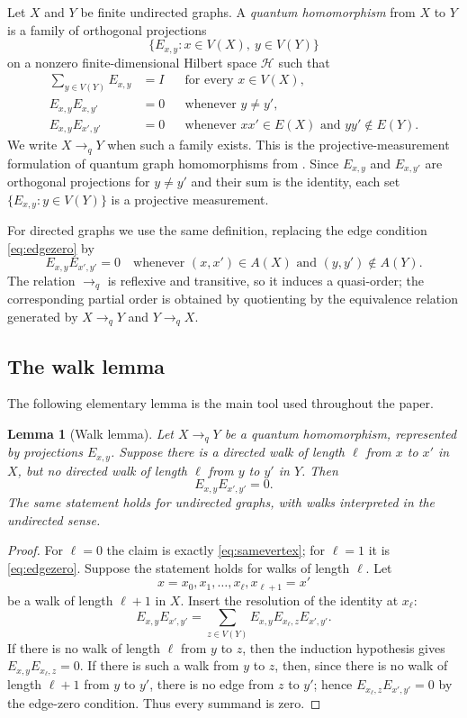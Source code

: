 \documentclass[11pt]{amsart}
\theoremstyle{plain}
\newtheorem{lemma}[theorem]{Lemma}
\theoremstyle{definition}
\newcommand{\toq}{\to_q}
\newcommand{\Id}{I}
\newcommand{\HH}{\mathcal H}
\begin{document}
Let $X$ and $Y$ be finite undirected graphs.  A \emph{quantum homomorphism} from $X$ to $Y$ is a family of orthogonal projections
\[
   \{E_{x,y}:x\in V(X),\ y\in V(Y)\}
\]
on a nonzero finite-dimensional Hilbert space $\HH$ such that
\begin{align}
   \sum_{y\in V(Y)} E_{x,y} &= \Id &&\text{for every }x\in V(X), \label{eq:complete}\\
   E_{x,y}E_{x,y'} &=0 &&\text{whenever }y\ne y', \label{eq:samevertex}\\
   E_{x,y}E_{x',y'} &=0 &&\text{whenever }xx'\in E(X)\text{ and }yy'\notin E(Y). \label{eq:edgezero}
\end{align}
We write $X\toq Y$ when such a family exists.  This is the projective-measurement formulation of quantum graph homomorphisms from \cite{MRQuantumHom}.  Since $E_{x,y}$ and $E_{x,y'}$ are orthogonal projections for $y\ne y'$ and their sum is the identity, each set $\{E_{x,y}:y\in V(Y)\}$ is a projective measurement.

For directed graphs we use the same definition, replacing the edge condition \eqref{eq:edgezero} by
\[
   E_{x,y}E_{x',y'}=0
   \quad\text{whenever }(x,x')\in A(X)\text{ and }(y,y')\notin A(Y).
\]
The relation $\toq$ is reflexive and transitive, so it induces a quasi-order; the corresponding partial order is obtained by quotienting by the equivalence relation generated by $X\toq Y$ and $Y\toq X$.

\subsection{The walk lemma}

The following elementary lemma is the main tool used throughout the paper.

\begin{lemma}[Walk lemma]\label{lem:walk}
Let $X\toq Y$ be a quantum homomorphism, represented by projections $E_{x,y}$.  Suppose there is a directed walk of length $\ell$ from $x$ to $x'$ in $X$, but no directed walk of length $\ell$ from $y$ to $y'$ in $Y$.  Then
\[
   E_{x,y}E_{x',y'}=0.
\]
The same statement holds for undirected graphs, with walks interpreted in the undirected sense.
\end{lemma}

\begin{proof}
For $\ell=0$ the claim is exactly \eqref{eq:samevertex}; for $\ell=1$ it is \eqref{eq:edgezero}.  Suppose the statement holds for walks of length $\ell$.  Let
\[
   x=x_0,x_1,\ldots,x_\ell,x_{\ell+1}=x'
\]
be a walk of length $\ell+1$ in $X$.  Insert the resolution of the identity at $x_\ell$:
\[
   E_{x,y}E_{x',y'}
   =\sum_{z\in V(Y)} E_{x,y}E_{x_\ell,z}E_{x',y'}.
\]
If there is no walk of length $\ell$ from $y$ to $z$, then the induction hypothesis gives $E_{x,y}E_{x_\ell,z}=0$.  If there is such a walk from $y$ to $z$, then, since there is no walk of length $\ell+1$ from $y$ to $y'$, there is no edge from $z$ to $y'$; hence $E_{x_\ell,z}E_{x',y'}=0$ by the edge-zero condition.  Thus every summand is zero.
\end{proof}
\end{document}
